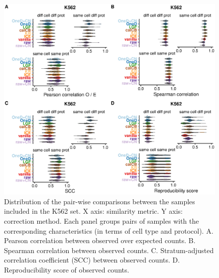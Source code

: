 \documentclass[12pt]{report}
\begin{document}
\begin{figure}
	\centerline{\includegraphics[width=\textwidth]{nar_figures/supp_figure_3.eps}}
  \caption{Distribution of the pair-wise comparisons between the
samples included in the K562 set. X axis: similarity metric. Y axis:
correction method. Each panel groups pairs of samples with the
corresponding characteristics (in terms of cell type and protocol). A.
Pearson correlation between observed over expected counts. B. Spearman
correlation between observed counts. C. Stratum-adjusted correlation
coefficient (SCC) between observed counts. D. Reproducibility score of
observed counts.} \end{figure}
\end{document}
